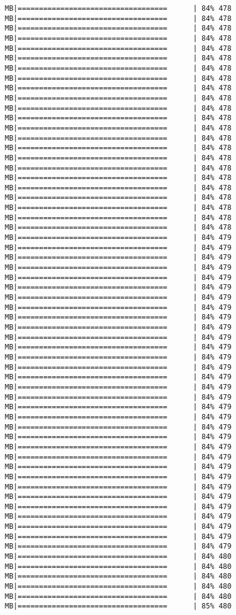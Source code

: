 \documentclass[
]{article}
\begin{document}
\begin{verbatim}
MB|===================================      | 84% 478 MB|===================================      | 84% 478 MB|===================================      | 84% 478 MB|===================================      | 84% 478 MB|===================================      | 84% 478 MB|===================================      | 84% 478 MB|===================================      | 84% 478 MB|===================================      | 84% 478 MB|===================================      | 84% 478 MB|===================================      | 84% 478 MB|===================================      | 84% 478 MB|===================================      | 84% 478 MB|===================================      | 84% 478 MB|===================================      | 84% 478 MB|===================================      | 84% 478 MB|===================================      | 84% 478 MB|===================================      | 84% 478 MB|===================================      | 84% 478 MB|===================================      | 84% 478 MB|===================================      | 84% 478 MB|===================================      | 84% 478 MB|===================================      | 84% 478 MB|===================================      | 84% 478 MB|===================================      | 84% 479 MB|===================================      | 84% 479 MB|===================================      | 84% 479 MB|===================================      | 84% 479 MB|===================================      | 84% 479 MB|===================================      | 84% 479 MB|===================================      | 84% 479 MB|===================================      | 84% 479 MB|===================================      | 84% 479 MB|===================================      | 84% 479 MB|===================================      | 84% 479 MB|===================================      | 84% 479 MB|===================================      | 84% 479 MB|===================================      | 84% 479 MB|===================================      | 84% 479 MB|===================================      | 84% 479 MB|===================================      | 84% 479 MB|===================================      | 84% 479 MB|===================================      | 84% 479 MB|===================================      | 84% 479 MB|===================================      | 84% 479 MB|===================================      | 84% 479 MB|===================================      | 84% 479 MB|===================================      | 84% 479 MB|===================================      | 84% 479 MB|===================================      | 84% 479 MB|===================================      | 84% 479 MB|===================================      | 84% 479 MB|===================================      | 84% 479 MB|===================================      | 84% 479 MB|===================================      | 84% 479 MB|===================================      | 84% 479 MB|===================================      | 84% 480 MB|===================================      | 84% 480 MB|===================================      | 84% 480 MB|===================================      | 84% 480 MB|===================================      | 84% 480 MB|===================================      | 85% 480 
\end{verbatim}
\end{document}
